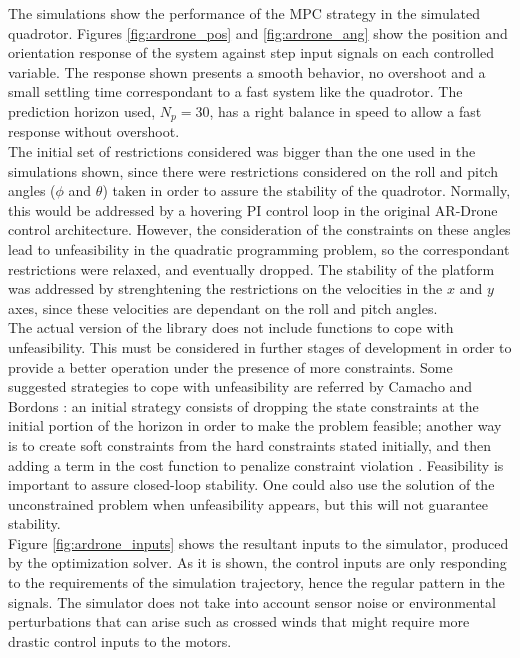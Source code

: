 The simulations show the performance of the MPC strategy in the simulated quadrotor. Figures \ref{fig:ardrone_pos} and \ref{fig:ardrone_ang} show the position and orientation  response of the system against step input signals on each controlled variable. The response shown presents a smooth behavior, no overshoot and a small settling time correspondant to a fast system like the quadrotor. The prediction horizon used, $N_p = 30$, has a right balance in speed to allow a fast response without overshoot.\\

The initial set of restrictions considered was bigger than the one used in the simulations shown, since there were restrictions considered on the roll and pitch angles ($\phi$ and $\theta$) taken in order to assure the stability of the quadrotor. Normally, this would be addressed by a hovering PI control loop in the original AR-Drone control architecture. However, the consideration of the constraints on these angles lead to unfeasibility in the quadratic programming problem, so  the correspondant restrictions were relaxed, and eventually dropped. The stability of the platform was addressed by strenghtening the restrictions on the velocities in the $x$ and $y$ axes, since these velocities are dependant on the roll and pitch angles. \\

The actual version of the library does not include functions to cope with unfeasibility. This must be considered in further stages of development in order to provide a better operation under the presence of more constraints. Some suggested strategies to cope with unfeasibility are referred by Camacho and Bordons \cite{CamachoBordons}: an initial strategy consists of dropping the state constraints at the initial portion of the horizon in order to make the problem feasible; another way is to create soft constraints from the hard constraints stated initially, and then adding a term in the cost function to penalize constraint violation \cite{Molero2011}. Feasibility is important to assure closed-loop stability. One could also use the solution of the unconstrained problem  when unfeasibility appears, but this will not guarantee stability. \\

Figure \ref{fig:ardrone_inputs} shows the resultant inputs to the simulator, produced by the optimization solver. As it is shown, the control inputs are only responding to the requirements of the simulation trajectory, hence the regular pattern in the signals. The simulator does not take into account sensor noise or environmental perturbations that can arise such as crossed winds that might require more drastic control inputs to the motors.  \\

